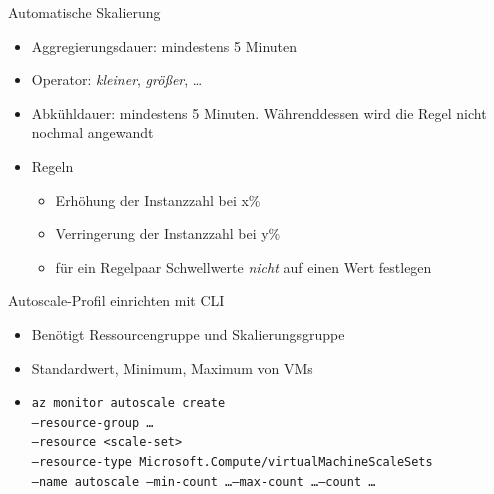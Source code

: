 \begin{flashcard}[Definition]{Automatische Skalierung}
\begin{itemize}
\begin{itemize}
                \item Minimum/Maximum
                \item Summe
                \item Letzte
                \item Anzahl
            \end{itemize}
        \item Aggregierungsdauer: mindestens 5 Minuten
        \item Operator: \emph{kleiner}, \emph{größer}, \ldots
        \item Abkühldauer: mindestens 5 Minuten. Währenddessen wird die Regel nicht nochmal angewandt
        \item Regeln
            \begin{itemize}
                \item Erhöhung der Instanzzahl bei x\%
                \item Verringerung der Instanzzahl bei y\%
                \item für ein Regelpaar Schwellwerte \emph{nicht} auf einen Wert festlegen
            \end{itemize}

    \end{itemize}
\end{flashcard}

\begin{flashcard}[Definition]{Autoscale-Profil einrichten mit CLI}
    \begin{itemize}
        \item Benötigt Ressourcengruppe und Skalierungsgruppe
        \item Standardwert, Minimum, Maximum von VMs
        \item \texttt{az monitor autoscale create\\--resource-group \ldots\\--resource <scale-set>\\--resource-type Microsoft.Compute/virtualMachineScaleSets\\--name autoscale --min-count \ldots --max-count \ldots --count \ldots}
    \end{itemize}
\end{flashcard}

